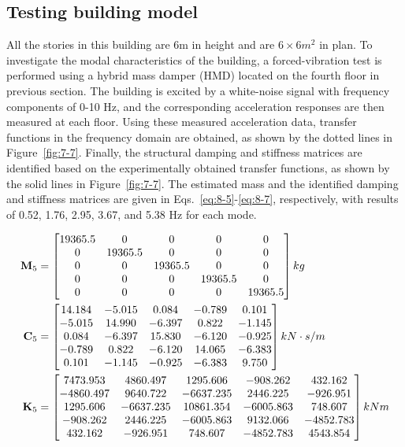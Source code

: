 \subsection{Testing building model}

All the stories in this building are 6m in height and are $6\times6m^{2}$ in plan. To investigate the modal characteristics of the building, a forced-vibration test is performed using a hybrid mass damper (HMD) located on the fourth floor in previous section. The building is excited by a white-noise signal with frequency components of 0-10 Hz, and the corresponding acceleration responses are then measured at each floor. Using these measured acceleration data, transfer functions in the frequency domain are obtained, as shown by the dotted lines in Figure~\ref{fig:7-7}. Finally, the structural damping and stiffness matrices are identified based on the experimentally obtained transfer functions, as shown by the solid lines in Figure~\ref{fig:7-7}. The estimated mass and the identified damping and stiffness matrices are given in Eqs.~\eqref{eq:8-5}-\eqref{eq:8-7}, respectively, with results of 0.52, 1.76, 2.95, 3.67, and 5.38 Hz for each mode.


\begin{align}
\mathbf{M}_{5} & = \begin{bmatrix} 19365.5 & 0 & 0 & 0 & 0\\ 0 & 19365.5 & 0 & 0 & 0 \\ 0 & 0 & 19365.5 & 0 & 0 \\ 0 & 0 & 0 & 19365.5 & 0 \\ 0 & 0 & 0 & 0 & 19365.5\end{bmatrix}kg \label{eq:8-5} \\
\mathbf{C}_{5} & = \begin{bmatrix} 14.184 & -5.015 & 0.084  & -0.789 & 0.101 \\ -5.015 & 14.990  & -6.397 & 0.822 & -1.145 \\ 0.084  & -6.397 & 15.830  & -6.120  & -0.925 \\ -0.789 & 0.822  & -6.120 & 14.065  & -6.383 \\ 0.101 & -1.145  & -0.925  & -6.383 & 9.750\end{bmatrix}kN\cdot s/m \label{eq:8-6} \\
\mathbf{K}_{5} & = \begin{bmatrix} 7473.953 & 4860.497 & 1295.606 & -908.262 & 432.162 \\ -4860.497 & 9640.722 & -6637.235 & 2446.225 & -926.951 \\ 1295.606 & -6637.235 & 10861.354 & -6005.863 & 748.607 \\ -908.262 & 2446.225 & -6005.863 & 9132.066 & -4852.783 \\ 432.162 & -926.951 & 748.607 & -4852.783 & 4543.854\end{bmatrix}kN\/m \label{eq:8-7}
\end{align}

